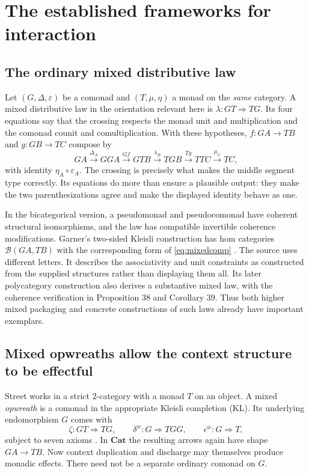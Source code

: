 \documentclass[11pt,letterpaper]{article}
\newcommand{\Cat}{\mathbf{Cat}}
\newcommand{\comp}{\mathbin{\circ}}
\begin{document}
\section{The established frameworks for interaction}
\label{sec:interaction}
\subsection{The ordinary mixed distributive law}
Let $(G,\Delta,\varepsilon)$ be a comonad and $(T,\mu,\eta)$ a monad on the \emph{same} category. A mixed distributive law in the orientation relevant here is $\lambda:GT\Rightarrow TG$. Its four equations say that the crossing respects the monad unit and multiplication and the comonad counit and comultiplication. With these hypotheses, $f:GA\to TB$ and $g:GB\to TC$ compose by
\begin{equation}\label{eq:mixedcomp}
GA\xrightarrow{\Delta_A}GGA
 \xrightarrow{Gf}GTB
 \xrightarrow{\lambda_B}TGB
 \xrightarrow{Tg}TTC
 \xrightarrow{\mu_C}TC,
\end{equation}
with identity $\eta_A\comp\varepsilon_A$. The crossing is precisely what makes the middle segment type correctly. Its equations do more than ensure a plausible output: they make the two parenthesizations agree and make the displayed identity behave as one.

In the bicategorical version, a pseudomonad and pseudocomonad have coherent structural isomorphisms, and the law has compatible invertible coherence modifications. Garner's two-sided Kleisli construction has hom categories $\mathcal B(GA,TB)$ with the corresponding form of \eqref{eq:mixedcomp} \cite[Definition 14]{Garner}. The source uses different letters. It describes the associativity and unit constraints as constructed from the supplied structures rather than displaying them all. Its later polycategory construction also derives a substantive mixed law, with the coherence verification in Proposition 38 and Corollary 39. Thus both higher mixed packaging and concrete constructions of such laws already have important exemplars.

\subsection{Mixed opwreaths allow the context structure to be effectful}
Street works in a strict 2-category with a monad $T$ on an object. A mixed \emph{opwreath} is a comonad in the appropriate Kleisli completion (KL). Its underlying endomorphism $G$ comes with
\[
\zeta:GT\Rightarrow TG,\qquad
\delta^{w}:G\Rightarrow TGG,\qquad
\epsilon^{w}:G\Rightarrow T,
\]
subject to seven axioms \cite[Definition 5 and Proposition 7]{Street}. In $\Cat$ the resulting arrows again have shape $GA\to TB$. Now context duplication and discharge may themselves produce monadic effects. There need not be a separate ordinary comonad on $G$.
\end{document}
